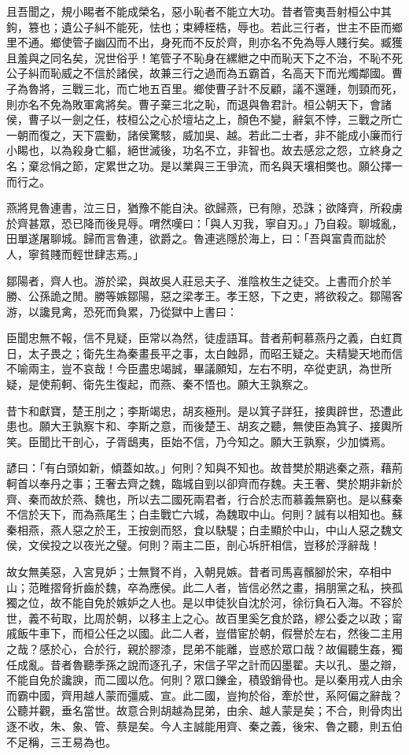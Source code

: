 \begin{pinyinscope}
且吾聞之，規小睗者不能成榮名，惡小恥者不能立大功。昔者管夷吾射桓公中其鉤，篡也；遺公子糾不能死，怯也；束縛桎梏，辱也。若此三行者，世主不臣而鄉里不通。鄉使管子幽囚而不出，身死而不反於齊，則亦名不免為辱人賤行矣。臧獲且羞與之同名矣，況世俗乎！笔管子不恥身在縲紲之中而恥天下之不治，不恥不死公子糾而恥威之不信於諸侯，故兼三行之過而為五霸首，名高天下而光燭鄰國。曹子為魯將，三戰三北，而亡地五百里。鄉使曹子計不反顧，議不還踵，刎頸而死，則亦名不免為敗軍禽將矣。曹子棄三北之恥，而退與魯君計。桓公朝天下，會諸侯，曹子以一劍之任，枝桓公之心於壇坫之上，顏色不變，辭氣不悖，三戰之所亡一朝而復之，天下震動，諸侯驚駭，威加吳、越。若此二士者，非不能成小廉而行小睗也，以為殺身亡軀，絕世滅後，功名不立，非智也。故去感忿之怨，立終身之名；棄忿悁之節，定累世之功。是以業與三王爭流，而名與天壤相獘也。願公擇一而行之。

燕將見魯連書，泣三日，猶豫不能自決。欲歸燕，已有隙，恐誅；欲降齊，所殺虜於齊甚眾，恐已降而後見辱。喟然嘆曰：「與人刃我，寧自刃。」乃自殺。聊城亂，田單遂屠聊城。歸而言魯連，欲爵之。魯連逃隱於海上，曰：「吾與富貴而詘於人，寧貧賤而輕世肆志焉。」

鄒陽者，齊人也。游於梁，與故吳人莊忌夫子、淮陰枚生之徒交。上書而介於羊勝、公孫詭之閒。勝等嫉鄒陽，惡之梁孝王。孝王怒，下之吏，將欲殺之。鄒陽客游，以讒見禽，恐死而負累，乃從獄中上書曰：

臣聞忠無不報，信不見疑，臣常以為然，徒虛語耳。昔者荊軻慕燕丹之義，白虹貫日，太子畏之；衛先生為秦畫長平之事，太白蝕昴，而昭王疑之。夫精變天地而信不喻兩主，豈不哀哉！今臣盡忠竭誠，畢議願知，左右不明，卒從吏訊，為世所疑，是使荊軻、衛先生復起，而燕、秦不悟也。願大王孰察之。

昔卞和獻寶，楚王刖之；李斯竭忠，胡亥極刑。是以箕子詳狂，接輿辟世，恐遭此患也。願大王孰察卞和、李斯之意，而後楚王、胡亥之聽，無使臣為箕子、接輿所笑。臣聞比干剖心，子胥鴟夷，臣始不信，乃今知之。願大王孰察，少加憐焉。

諺曰：「有白頭如新，傾蓋如故。」何則？知與不知也。故昔樊於期逃秦之燕，藉荊軻首以奉丹之事；王奢去齊之魏，臨城自剄以卻齊而存魏。夫王奢、樊於期非新於齊、秦而故於燕、魏也，所以去二國死兩君者，行合於志而慕義無窮也。是以蘇秦不信於天下，而為燕尾生；白圭戰亡六城，為魏取中山。何則？誠有以相知也。蘇秦相燕，燕人惡之於王，王按劍而怒，食以駃騠；白圭顯於中山，中山人惡之魏文侯，文侯投之以夜光之璧。何則？兩主二臣，剖心坼肝相信，豈移於浮辭哉！

故女無美惡，入宮見妒；士無賢不肖，入朝見嫉。昔者司馬喜髕腳於宋，卒相中山；范睢摺脅折齒於魏，卒為應侯。此二人者，皆信必然之畫，捐朋黨之私，挾孤獨之位，故不能自免於嫉妒之人也。是以申徒狄自沈於河，徐衍負石入海。不容於世，義不茍取，比周於朝，以移主上之心。故百里奚乞食於路，繆公委之以政；甯戚飯牛車下，而桓公任之以國。此二人者，豈借宦於朝，假譽於左右，然後二主用之哉？感於心，合於行，親於膠漆，昆弟不能離，豈惑於眾口哉？故偏聽生姦，獨任成亂。昔者魯聽季孫之說而逐孔子，宋信子罕之計而囚墨翟。夫以孔、墨之辯，不能自免於讒諛，而二國以危。何則？眾口鑠金，積毀銷骨也。是以秦用戎人由余而霸中國，齊用越人蒙而彊威、宣。此二國，豈拘於俗，牽於世，系阿偏之辭哉？公聽并觀，垂名當世。故意合則胡越為昆弟，由余、越人蒙是矣；不合，則骨肉出逐不收，朱、象、管、蔡是矣。今人主誠能用齊、秦之義，後宋、魯之聽，則五伯不足稱，三王易為也。


\end{pinyinscope}
